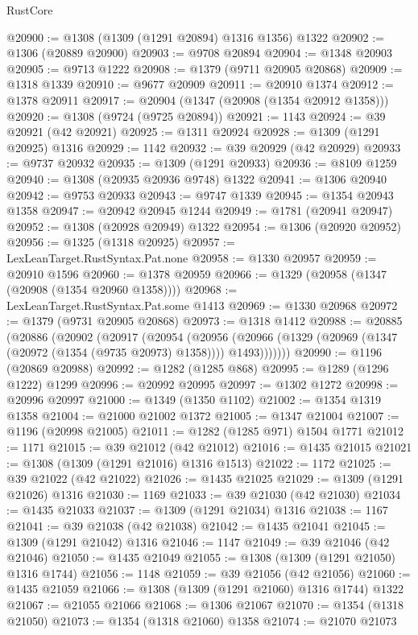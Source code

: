 \begin{lexlean}{RustCore}
\begin{coremodule}
@20900 := @1308 (@1309 (@1291 @20894) @1316 @1356) @1322
@20902 := @1306 (@20889 @20900)
@20903 := @9708 @20894
@20904 := @1348 @20903
@20905 := @9713 @1222
@20908 := @1379 (@9711 @20905 @20868)
@20909 := @1318 @1339
@20910 := @9677 @20909
@20911 := @20910 @1374
@20912 := @1378 @20911
@20917 := @20904 (@1347 (@20908 (@1354 @20912 @1358)))
@20920 := @1308 (@9724 (@9725 @20894))
@20921 := 1143
@20924 := @39 @20921 (@42 @20921)
@20925 := @1311 @20924
@20928 := @1309 (@1291 @20925) @1316
@20929 := 1142
@20932 := @39 @20929 (@42 @20929)
@20933 := @9737 @20932
@20935 := @1309 (@1291 @20933)
@20936 := @8109 @1259
@20940 := @1308 (@20935 @20936 @9748) @1322
@20941 := @1306 @20940
@20942 := @9753 @20933
@20943 := @9747 @1339
@20945 := @1354 @20943 @1358
@20947 := @20942 @20945 @1244
@20949 := @1781 (@20941 @20947)
@20952 := @1308 (@20928 @20949) @1322
@20954 := @1306 (@20920 @20952)
@20956 := @1325 (@1318 @20925)
@20957 := LexLeanTarget.RustSyntax.Pat.none
@20958 := @1330 @20957
@20959 := @20910 @1596
@20960 := @1378 @20959
@20966 := @1329 (@20958 (@1347 (@20908 (@1354 @20960 @1358))))
@20968 := LexLeanTarget.RustSyntax.Pat.some @1413
@20969 := @1330 @20968
@20972 := @1379 (@9731 @20905 @20868)
@20973 := @1318 @1412
@20988 := @20885
    (@20886
      (@20902
        (@20917
          (@20954
            (@20956
              (@20966 (@1329 (@20969 (@1347 (@20972 (@1354 (@9735 @20973) @1358)))) @1493)))))))
@20990 := @1196 (@20869 @20988)
@20992 := @1282 (@1285 @868)
@20995 := @1289 (@1296 @1222) @1299
@20996 := @20992 @20995
@20997 := @1302 @1272
@20998 := @20996 @20997
@21000 := @1349 (@1350 @1102)
@21002 := @1354 @1319 @1358
@21004 := @21000 @21002 @1372
@21005 := @1347 @21004
@21007 := @1196 (@20998 @21005)
@21011 := @1282 (@1285 @971) @1504 @1771
@21012 := 1171
@21015 := @39 @21012 (@42 @21012)
@21016 := @1435 @21015
@21021 := @1308 (@1309 (@1291 @21016) @1316 @1513)
@21022 := 1172
@21025 := @39 @21022 (@42 @21022)
@21026 := @1435 @21025
@21029 := @1309 (@1291 @21026) @1316
@21030 := 1169
@21033 := @39 @21030 (@42 @21030)
@21034 := @1435 @21033
@21037 := @1309 (@1291 @21034) @1316
@21038 := 1167
@21041 := @39 @21038 (@42 @21038)
@21042 := @1435 @21041
@21045 := @1309 (@1291 @21042) @1316
@21046 := 1147
@21049 := @39 @21046 (@42 @21046)
@21050 := @1435 @21049
@21055 := @1308 (@1309 (@1291 @21050) @1316 @1744)
@21056 := 1148
@21059 := @39 @21056 (@42 @21056)
@21060 := @1435 @21059
@21066 := @1308 (@1309 (@1291 @21060) @1316 @1744) @1322
@21067 := @21055 @21066
@21068 := @1306 @21067
@21070 := @1354 (@1318 @21050)
@21073 := @1354 (@1318 @21060) @1358
@21074 := @21070 @21073

\end{coremodule}
\end{lexlean}
